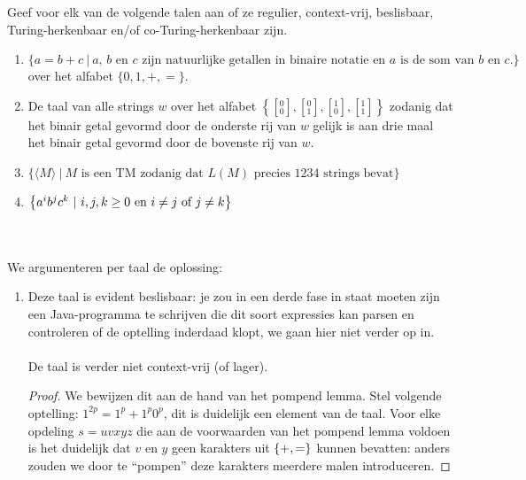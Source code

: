 \documentclass[a4paper]{article}
\newcommand{\twar}[2]{\left[ { }^{#1}_{#2} \right] }
\begin{document}
\begin{question}
Geef voor elk van de volgende talen aan of ze regulier, context-vrij, beslisbaar, Turing-herkenbaar en/of co-Turing-herkenbaar zijn.
\begin{enumerate}
  \item $\{ a = b+c \  | \ \text{$a$, $b$ en $c$ zijn natuurlijke getallen in binaire notatie en $a$ is de som van $b$ en $c$.} \}$ over het alfabet $\{0,1,+,=\}$.
  \item De taal van alle strings $w$ over het alfabet $\left\{ \twar{0}{0}, \twar{0}{1}, \twar{1}{0}, \twar{1}{1} \right\}$ zodanig dat het binair getal gevormd door de onderste rij van $w$ gelijk is aan drie maal het binair getal gevormd door de bovenste rij van $w$. 
  \item $\{ \langle M \rangle \ | \ \text{$M$ is een TM zodanig dat $L(M)$ precies 1234 strings bevat} \}$ %
  \item $\left\{ a^ib^jc^k\ |\ \text{$i,j,k \geq 0$ en $i \neq j$ of $j \neq k$} \right\}$ 
\end{enumerate}
\begin{answer}~~
\paragraph{}
We argumenteren per taal de oplossing:
\begin{enumerate}
 \item Deze taal is evident beslisbaar: je zou in een derde fase in staat moeten zijn een Java-programma te schrijven die dit soort expressies kan parsen en controleren of de optelling inderdaad klopt, we gaan hier niet verder op in.
 \paragraph{}De taal is verder niet context-vrij (of lager).
 \begin{proof}
  We bewijzen dit aan de hand van het pompend lemma. Stel volgende optelling: $1^{2p}=1^p+1^p0^p$, dit is duidelijk een element van de taal. Voor elke opdeling $s=uvxyz$ die aan de voorwaarden van het pompend lemma voldoen is het duidelijk dat $v$ en $y$ geen karakters uit $\left\{ +,= \right\}$ kunnen bevatten: anders zouden we door te ``pompen'' deze karakters meerdere malen introduceren.

\end{proof}
\end{enumerate}
\end{answer}
\end{question}
\end{document}
